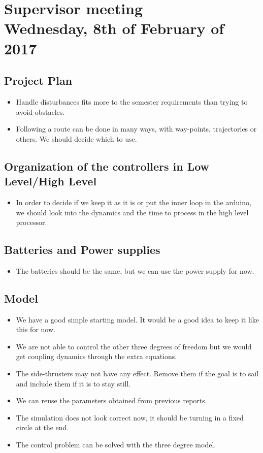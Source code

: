 
\renewcommand{\vec}[1]{\boldsymbol{\mathbf{#1}}}

\renewcommand\chaptername{KAPITEL}
\renewcommand\contentsname{Indhold}
\renewcommand\figurename{Figur}
\renewcommand\tablename{Tabel}

\section*{Supervisor meeting\\ \small Wednesday, 8th of February of 2017}
\subsection{Project Plan}
\begin{itemize}
	\item Handle disturbances fits more to the semester requirements than trying to avoid obstacles.
	\item Following a route can be done in many ways, with way-points, trajectories or others. We should decide which to use.
\end{itemize}	
\subsection{Organization of the controllers in Low Level/High Level}
\begin{itemize}
	\item In order to decide if we keep it as it is or put the inner loop in the arduino, we should look into the dynamics and the time to process in the high level processor.
\end{itemize}
\subsection{Batteries and Power supplies}
\begin{itemize}
	\item The batteries should be the same, but we can use the power supply for now.
\end{itemize}
\subsection{Model}
\begin{itemize}
	\item We have a good simple starting model. It would be a good idea to keep it like this for now.
	\item We are not able to control the other three degrees of freedom but we would get coupling dynamics through the extra equations.
	\item The side-thrusters may not have any effect. Remove them if the goal is to sail and include them if it is to stay still.
	\item We can reuse the parameters obtained from previous reports.
	\item The simulation does not look correct now, it should be turning in a fixed circle at the end. 
	\item The control problem can be solved with the three degree model.
\end{itemize}
